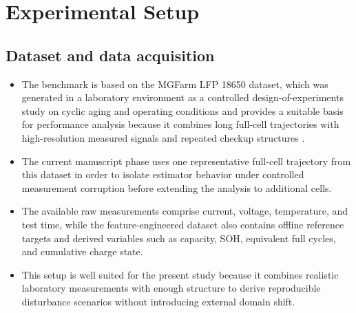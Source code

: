 \documentclass[review]{elsarticle}
\begin{document}
\section{Experimental Setup}
\subsection{Dataset and data acquisition}
\begin{itemize}[leftmargin=*]
    \item The benchmark is based on the MGFarm LFP 18650 dataset, which was generated in a laboratory environment as a controlled design-of-experiments study on cyclic aging and operating conditions and provides a suitable basis for performance analysis because it combines long full-cell trajectories with high-resolution measured signals and repeated checkup structures \cite{aqachtoulMGFARMIoTEdgeDriven2026,LFP_DoE_Cycle_Aging_Dataset,siebertzStatistischeVersuchsplanung2017}.
    \item The current manuscript phase uses one representative full-cell trajectory from this dataset in order to isolate estimator behavior under controlled measurement corruption before extending the analysis to additional cells.
    \item The available raw measurements comprise current, voltage, temperature, and test time, while the feature-engineered dataset also contains offline reference targets and derived variables such as capacity, SOH, equivalent full cycles, and cumulative charge state.
    \item This setup is well suited for the present study because it combines realistic laboratory measurements with enough structure to derive reproducible disturbance scenarios without introducing external domain shift.
\end{itemize}
\end{document}
